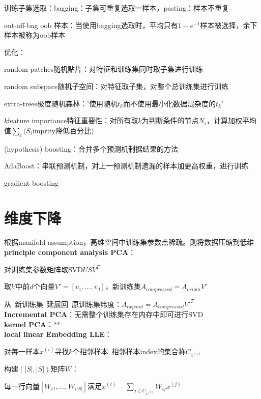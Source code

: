 \documentclass[UTF8]{ctexart}
\begin{document}
  训练子集选取：bagging：子集可重复选取一样本，pasting：样本不重复
  
  \quad out-off-bag oob 样本：当使用bagging选取时，平均只有$1-e^{-1}$样本被选择，余下样本被称为oob样本

  优化：

  \quad random patches随机贴片：对特征和训练集同时取子集进行训练
  
  \quad random subspace随机子空间：对特征取子集，对整个总训练集进行训练
  
  \quad extra-trees极度随机森林：'使用随机$t_k$而不使用最小化数据混杂度的$t_k$'
  
  \quad $k$feature importance特征重要性：对所有取$k$为判断条件的节点$N_i$，计算加权平均值$\sum_i(S_i$imprity降低百分比$)$
  
  \quad (hypothesis) boosting：合并多个预测机制据结果的方法
  
  \quad \quad AdaBoost：串联预测机制，对上一预测机制遗漏的样本加更高权重，进行训练

  \quad \quad gradient boosting


\section{维度下降}
\noindent 根据manifold assumption，高维空间中训练集参数点稀疏。则将数据压缩到低维\\
\textbf{principle component analysis PCA}：

  对训练集参数矩阵取SVD$USV^T$

  取$V$中前$d$个向量$V' = [v_1, ..., v_d]$，新训练集$A_{compressed} = A_{origin}V'$
  
  从\ 新训练集\ 延展回\ 原训练集纬度：$A_{expand} = A_{compressed}V'^T$\\
\textbf{Incremental PCA}：无需整个训练集存在内存中即可进行SVD\\
\textbf{kernel PCA}：**\\
\textbf{local linear Embedding LLE}：
  
  对每一样本$x^{(i)}$寻找$k$个相邻样本\ 相邻样本index的集合称$C_{x^{(i)}}$
  
  构建$(|S|, |S|)$矩阵$W$：
  
  \quad 每一行向量$[W_{i1}, ..., W_{i|S|}]$满足$x^{(i)} - \sum_{j \in C_{x^{(i)}}} W_{ij}x^{(j)}$
  
\end{document}
